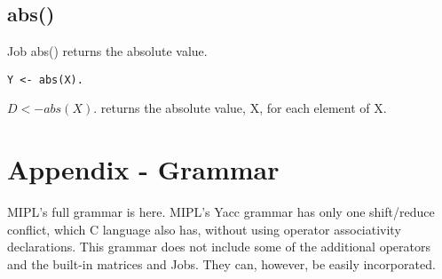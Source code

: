 \documentclass[prodmode,acmtecs]{acmsmall}
\begin{document}
\subsection{abs()}
Job abs() returns the absolute value.
\begin{lstlisting}
Y <- abs(X).
\end{lstlisting}

$D <- abs(X).$ returns the absolute value, X, for each element of X.
\medskip

\bigskip
\bigskip
\bigskip
\bigskip

\section*{Appendix - Grammar}

MIPL's full grammar is here. MIPL's Yacc grammar has only one
shift/reduce conflict, which C language also has, without using
operator associativity declarations. This grammar does not 
include some of the additional operators and the built-in matrices
and Jobs. They can, however, be easily incorporated.


%
%




%
%



\medskip

\end{document}
